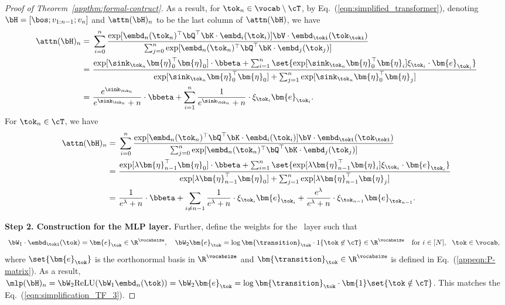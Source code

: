 \begin{proof}[Proof of Theorem~\ref{appthm:formal-contruct}]
As a result, for $\tok_n \in \vocab\setminus \cT$, by Eq.~(\ref{eqn:simplified_transformer}), denoting $\bH=[\bos; v_{1:n-1}; v_n]$ and $\attn(\bH)_n$ to be the last column of $\attn(\bH)$, we have
\begin{align*}
\attn(\bH)_n = &~ \sum_{i=0}^n \frac{\exp[ \embd_n(\tok_n)^\top \bQ^\top \bK\cdot \embd_i(\tok_i)] \bV \cdot  \embd_\toki(\tok_\toki)}{\sum_{j=0}^n\exp[\embd_n(\tok_n)^\top\bQ^\top \bK\cdot \embd_j(\tok_j)]}\\
= &~ \frac{\exp[\sink_{\tok_n} \bm{\eta}_{0}^\top \bm{\eta}_{0}]\cdot \bbeta + \sum_{i=1}^n \set{\exp[\sink_{\tok_n} \bm{\eta}_{0}^\top \bm{\eta}_{i}] \xi_{\tok_i} \cdot \bm{e}_{\tok_i}}}{\exp[\sink_{\tok_n} \bm{\eta}_{0}^\top \bm{\eta}_{0}]+\sum_{j=1}^n\exp[\sink_{\tok_n} \bm{\eta}_{0}^\top \bm{\eta}_{j}]}\\
= &~  \frac{e^{\sink_{\tok_n}}}{e^{\sink_{\tok_n}} + n} \cdot \bbeta +  \sum_{i=1}^n \frac{1}{e^{\sink_{\tok_n}} + n} \cdot \xi_{\tok_i} \bm{e}_{\tok_i}.
\end{align*}
For $\tok_n \in \cT$, we have
\begin{align*}
\attn(\bH)_n = &~ \sum_{i=0}^n \frac{\exp[\embd_n(\tok_n)^\top \bQ^\top \bK\cdot\embd_i(\tok_i)] \bV \cdot \embd_\toki(\tok_\toki)}{\sum_{j=0}^n\exp[\embd_n(\tok_n)^\top \bQ^\top \bK\cdot \embd_j(\tok_j)]}\\
= &~ \frac{\exp[\lambda \bm{\eta}_{n-1}^\top \bm{\eta}_{0}]\cdot \bbeta + \sum_{i=1}^n \set{\exp[\lambda \bm{\eta}_{n-1}^\top \bm{\eta}_{i}] \xi_{\tok_i} \cdot \bm{e}_{\tok_i}}}{\exp[\lambda \bm{\eta}_{n-1}^\top \bm{\eta}_{0}]+\sum_{j=1}^n\exp[\lambda \bm{\eta}_{n-1}^\top \bm{\eta}_{j}]}\\
= &~  \frac{1}{e^\lambda + n} \cdot \bbeta +  \sum_{i\neq n-1} \frac{1}{e^\lambda + n} \cdot \xi_{\tok_i} \bm{e}_{\tok_i} + \frac{e^\lambda}{e^\lambda + n} \cdot \xi_{\tok_{n-1}} \bm{e}_{\tok_{n-1}}.
\end{align*}

\noindent
{\bf Step 2. Construction for the MLP layer.} Further, define the weights for the \mlp~layer such that
\begin{equation}
\begin{aligned}
&~ \bW_1 \cdot \embd_\toki(\tok) = \bm{e}_\tok \in \R^\vocabsize, ~~~\bW_2\bm{e}_\tok =\log \bm{\transition}_{\tok} \cdot 1\{ \tok \not\in \cT  \} \in \R^\vocabsize  ~~~ \text{for } i\in[N],~~\tok \in \vocab,
\end{aligned}
\end{equation}
where $\set{\bm{e}_\tok}$ is the eorthonormal basis in $\R^\vocabsize$ and $\bm{\transition}_\tok \in \R^\vocabsize$ is defined in Eq.~(\ref{appeqn:P-matrix}). As a result, $\mlp(\bH)_n = \bW_2\text{ReLU}(\bW_1 \embd_n(\tok)) =\bW_2 \bm{e}_\tok =\log \bm{\transition}_\tok \cdot \bm{1}\set{\tok \notin \cT} $.
 This matches the Eq.~(\ref{eqn:simplification_TF_3}). 


\end{proof}
